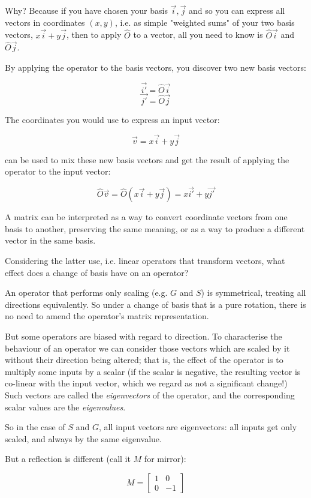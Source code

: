 Why? Because if you have chosen your basis $\vec{i}, \vec{j}$ and so you can express all vectors in coordinates $(x, y)$, i.e. as simple "weighted sums" of your two basis vectors, $x\vec{i} + y\vec{j}$, then to apply $\hat{O}$ to a vector, all you need to know is $\hat{O}\vec{i}$ and $\hat{O}\vec{j}$.

By applying the operator to the basis vectors, you discover two new basis vectors:

$$\vec{i'} = \hat{O}\vec{i}$$
$$\vec{j'} = \hat{O}\vec{j}$$

The coordinates you would use to express an input vector:

$$\vec{v} = x\vec{i} + y\vec{j}$$

can be used to mix these new basis vectors and get the result of applying the operator to the input vector:

$$\hat{O}\vec{v} = \hat{O}(x\vec{i} + y\vec{j}) = x\vec{i'} + y\vec{j'}$$

A matrix can be interpreted as a way to convert coordinate vectors from one basis to another, preserving the same meaning, or as a way to produce a different vector in the same basis.

Considering the latter use, i.e. linear operators that transform vectors, what effect does a change of basis have on an operator?

An operator that performs only scaling (e.g. $G$ and $S$) is symmetrical, treating all directions equivalently. So under a change of basis that is a pure rotation, there is no need to amend the operator's matrix representation.

But some operators are biased with regard to direction. To characterise the behaviour of an operator we can consider those vectors which are scaled by it without their direction being altered; that is, the effect of the operator is to multiply some inputs by a scalar (if the scalar is negative, the resulting vector is co-linear with the input vector, which we regard as not a significant change!) Such vectors are called the \textit{eigenvectors} of the operator, and the corresponding scalar values are the \textit{eigenvalues}.

So in the case of $S$ and $G$, all input vectors are eigenvectors: all inputs get only scaled, and always by the same eigenvalue.

But a reflection is different (call it $M$ for mirror):

$$M = \begin{bmatrix}1 & 0 \\ 0 & -1\end{bmatrix}$$

